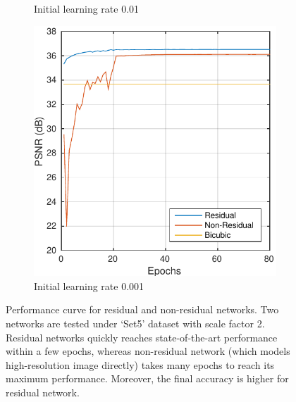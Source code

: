 \documentclass[10pt,twocolumn,letterpaper]{article}
\begin{document}
\begin{figure}[t]
\begin{subfigure}{0.3\textwidth}
		\caption{Initial learning rate 0.01}
		\label{fig:tiger}
	\end{subfigure}
	\hfill
	\begin{subfigure}{0.3\textwidth}
		\includegraphics[width=\textwidth]{figs/residual_exp2}
		\caption{Initial learning rate 0.001}
		\label{fig:mouse}
	\end{subfigure}
	\caption{Performance curve for residual and non-residual networks. Two networks are tested under `Set5' dataset with scale factor 2. Residual networks quickly reaches state-of-the-art performance within a few epochs, whereas non-residual network (which models high-resolution image directly) takes many epochs to reach its maximum performance. Moreover, the final accuracy is higher for residual network.}
	\label{fig:residual2}
\end{figure}
\end{document}
